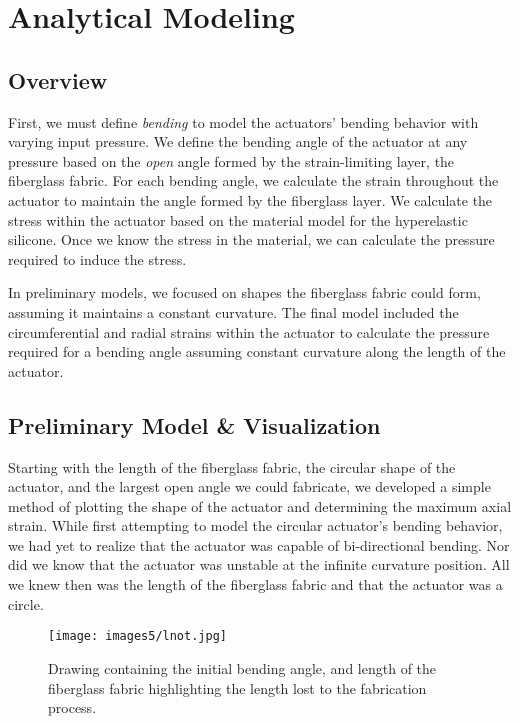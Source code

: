 \chapter{Analytical Modeling}

\section{Overview}
First, we must define \emph{bending} to model the actuators' bending behavior with varying input pressure. We define the bending angle of the actuator at any pressure based on the \emph{open} angle formed by the strain-limiting layer, the fiberglass fabric. For each bending angle, we calculate the strain throughout the actuator to maintain the angle formed by the fiberglass layer. We calculate the stress within the actuator based on the material model for the hyperelastic silicone. Once we know the stress in the material, we can calculate the pressure required to induce the stress. 

In preliminary models, we focused on shapes the fiberglass fabric could form, assuming it maintains a constant curvature. The final model included the circumferential and radial strains within the actuator to calculate the pressure required for a bending angle assuming constant curvature along the length of the actuator. 

\section{Preliminary Model \& Visualization}

Starting with the length of the fiberglass fabric, the circular shape of the actuator, and the largest open angle we could fabricate, we developed a simple method of plotting the shape of the actuator and determining the maximum axial strain. While first attempting to model the circular actuator's bending behavior, we had yet to realize that the actuator was capable of bi-directional bending. Nor did we know that the actuator was unstable at the infinite curvature position. All we knew then was the length of the fiberglass fabric and that the actuator was a circle. 

\begin{figure}[h]
    \centering
    \texttt{[image: images5/lnot.jpg]}
    \caption{Drawing containing the initial bending angle, and length of the fiberglass fabric highlighting the length lost to the fabrication process.}
    \label{fig:lnot}
\end{figure}

